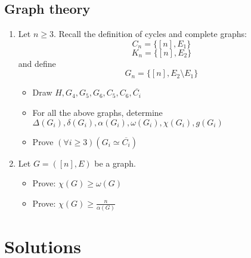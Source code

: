 \documentclass[11pt,paper=b5,footinclude,headinclude]{scrbook} %
\theoremstyle{remark}
\theoremstyle{definition} %
\theoremstyle{theorem} %
\begin{document}
\section{Graph theory}
\begin{enumerate}
\item Let $n\ge 3$. Recall the definition of cycles and complete graphs:
\[C_{n}=\{[n], E_{1}\}\]
\[K_{n}=\{[n], E_{2}\}\]
and define
\[G_{n}=\{[n], E_{2} \setminus E_{1}\}\]
\begin{itemize}
    \item Draw \(H, G_{4}, G_{5}, G_{6}, C_{5}, C_{6}, \overline{C_{i}}\)
    \item For all the above graphs, determine \(\Delta(G_{i}), \delta(G_{i}), \alpha(G_{i}), \omega(G_{i}), \chi(G_{i}), g(G_{i})\)
    \item Prove \((\forall i \geq 3) (G_{i} \simeq \overline{C_{i}})\)
\end{itemize}

\item Let \(G = ([n], E)\) be a graph.
\begin{itemize}
\item Prove: \(\chi (G) \geq \omega (G)\)
\item Prove: \(\chi (G) \geq \frac{n}{\alpha(G)}\)
\end{itemize}

\end{enumerate}


\chapter{Solutions} 
\end{document}
